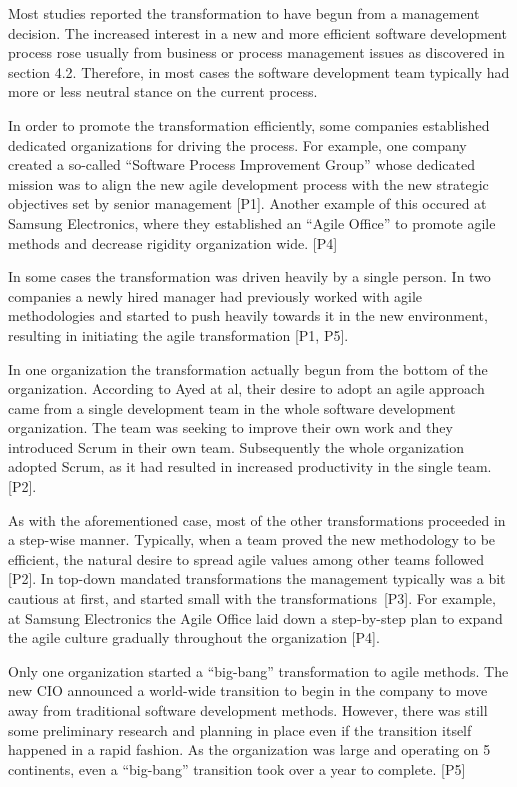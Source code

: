 Most studies reported the transformation to have begun from a management
decision. The increased interest in a new and more efficient software
development process rose usually from business or process management
issues as discovered in section 4.2. Therefore, in most cases the
software development team typically had more or less neutral stance on
the current process.

In order to promote the transformation efficiently, some companies
established dedicated organizations for driving the process. For
example, one company created a so-called ``Software Process Improvement
Group'' whose dedicated mission was to align the new agile development
process with the new strategic objectives set by senior management [P1].
Another example of this occured at Samsung Electronics, where they
established an ``Agile Office'' to promote agile methods and decrease
rigidity organization wide. [P4]

In some cases the transformation was driven heavily by a single person.
In two companies a newly hired manager had previously worked with
agile methodologies and started to push heavily towards it in the new
environment, resulting in initiating the agile transformation [P1, P5].

In one organization the transformation actually begun from the bottom
of the organization. According to Ayed at al, their desire to adopt an
agile approach came from a single development team in the whole software
development organization. The team was seeking to improve their own work
and they introduced Scrum in their own team. Subsequently the whole
organization adopted Scrum, as it had resulted in increased productivity
in the single team. [P2].

As with the aforementioned case, most of the other transformations
proceeded in a step-wise manner. Typically, when a team proved the new
methodology to be efficient, the natural desire to spread agile values
among other teams followed [P2]. In top-down mandated transformations
the management typically was a bit cautious at first, and started small
with the transformations [P3]. For example, at Samsung Electronics the
Agile Office laid down a step-by-step plan to expand the agile culture
gradually throughout the organization [P4].

Only one organization started a ``big-bang'' transformation to agile
methods. The new CIO announced a world-wide transition to begin in the
company to move away from traditional software development methods.
However, there was still some preliminary research and planning in
place even if the transition itself happened in a rapid fashion. As
the organization was large and operating on 5 continents, even a
``big-bang'' transition took over a year to complete. [P5]
